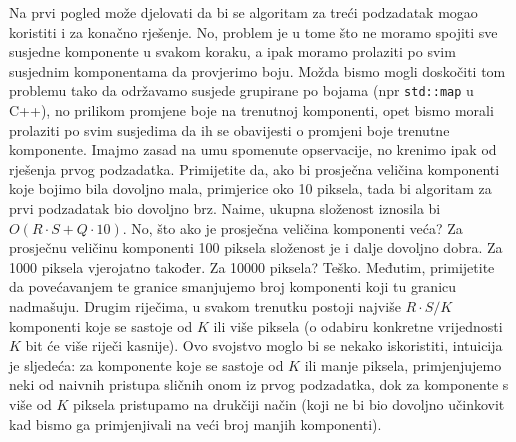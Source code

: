 Na prvi pogled može djelovati da bi se algoritam za treći podzadatak mogao
koristiti i za konačno rješenje. No, problem je u tome što ne moramo spojiti
sve susjedne komponente u svakom koraku, a ipak moramo prolaziti po svim
susjednim komponentama da provjerimo boju. Možda bismo mogli doskočiti tom
problemu tako da održavamo susjede grupirane po bojama (npr \verb|std::map| u
C++), no prilikom promjene boje na trenutnoj komponenti, opet bismo morali
prolaziti po svim susjedima da ih se obavijesti o promjeni boje trenutne
komponente. Imajmo zasad na umu spomenute opservacije, no krenimo ipak od
rješenja prvog podzadatka. Primijetite da, ako bi prosječna veličina komponenti
koje bojimo bila dovoljno mala, primjerice oko 10 piksela, tada bi algoritam za
prvi podzadatak bio dovoljno brz. Naime, ukupna složenost iznosila bi $O(R
\cdot S + Q \cdot 10)$. No, što ako je prosječna veličina komponenti veća? Za
prosječnu veličinu komponenti 100 piksela složenost je i dalje dovoljno dobra.
Za 1000 piksela vjerojatno također. Za 10000 piksela? Teško. Međutim,
primijetite da povećavanjem te granice smanjujemo broj komponenti koji tu
granicu nadmašuju. Drugim riječima, u svakom trenutku postoji najviše $R \cdot
S / K$ komponenti koje se sastoje od $K$ ili više piksela (o odabiru konkretne
vrijednosti $K$ bit će više riječi kasnije).  Ovo svojstvo moglo bi se nekako
iskoristiti, intuicija je sljedeća: za komponente koje se sastoje od $K$ ili
manje piksela, primjenjujemo neki od naivnih pristupa sličnih onom iz prvog
podzadatka, dok za komponente s više od $K$ piksela pristupamo na drukčiji
način (koji ne bi bio dovoljno učinkovit kad bismo ga primjenjivali na veći
broj manjih komponenti).

